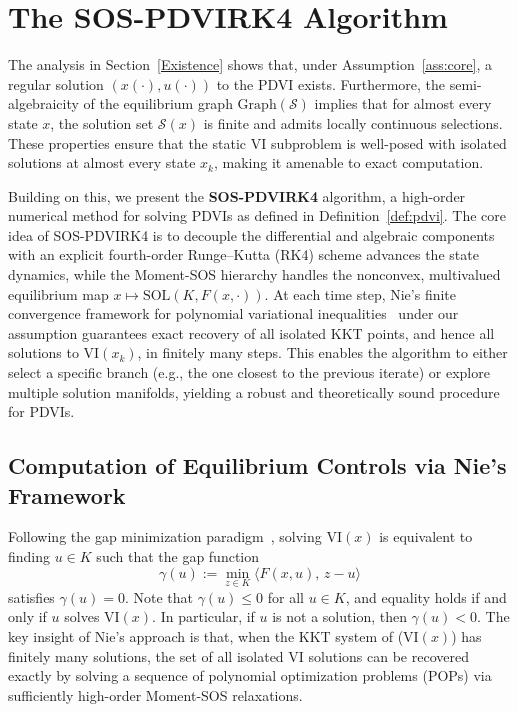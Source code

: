 \documentclass[sn-basic,Numbered]{sn-jnl}
\theoremstyle{thmstyleone}%
\begin{document}
\section{The SOS-PDVIRK4 Algorithm}
\label{sec:algorithm}

The analysis in Section~\ref{Existence} shows that, under Assumption~\ref{ass:core}, a regular solution $(x(\cdot), u(\cdot))$ to the PDVI exists. Furthermore, the semi-algebraicity of the equilibrium graph $\mathrm{Graph}(\mathcal{S})$ implies that for almost every state $x$, the solution set $\mathcal{S}(x)$ is finite and admits locally continuous selections. These properties ensure that the static VI subproblem is well-posed with isolated solutions at almost every state $x_k$, making it amenable to exact computation.

Building on this, we present the \textbf{SOS-PDVIRK4} algorithm, a high-order numerical method for solving PDVIs as defined in Definition~\ref{def:pdvi}. 
The core idea of SOS-PDVIRK4 is to decouple the differential and algebraic components with an explicit fourth-order Runge--Kutta (RK4) scheme advances the state dynamics, while the Moment-SOS hierarchy handles the nonconvex, multivalued equilibrium map $x \mapsto \mathrm{SOL}(K, F(x, \cdot))$. At each time step, Nie’s finite convergence framework for polynomial variational inequalities~\cite{Nie2025} under our assumption guarantees exact recovery of all isolated KKT points, and hence all solutions to $\mathrm{VI}(x_k)$, in finitely many steps. This enables the algorithm to either select a specific branch (e.g., the one closest to the previous iterate) or explore multiple solution manifolds, yielding a robust and theoretically sound procedure for PDVIs.


\subsection{Computation of Equilibrium Controls via Nie's Framework}

Following the gap minimization paradigm~\cite{Nie2025}, solving $\mathrm{VI}(x)$ is equivalent to finding $u \in K$ such that the gap function
\[
\gamma(u) := \min_{z \in K} \langle F(x, u),\, z - u \rangle
\]
satisfies $\gamma(u) = 0$. Note that $\gamma(u) \leq 0$ for all $u \in K$, and equality holds if and only if $u$ solves $\mathrm{VI}(x)$. In particular, if $u$ is not a solution, then $\gamma(u) < 0$.  The key insight of Nie’s approach is that, when the KKT system of (VI$(x)$) has finitely many solutions, the set of all isolated VI solutions can be recovered exactly by solving a sequence of polynomial optimization problems (POPs) via sufficiently high-order Moment-SOS relaxations.
\end{document}
